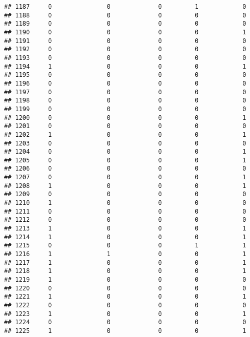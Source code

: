 \documentclass[]{article}
\begin{document}
\begin{verbatim}
## 1187     0               0             0         1            0
## 1188     0               0             0         0            0
## 1189     0               0             0         0            0
## 1190     0               0             0         0            1
## 1191     0               0             0         0            0
## 1192     0               0             0         0            0
## 1193     0               0             0         0            0
## 1194     1               0             0         0            1
## 1195     0               0             0         0            0
## 1196     0               0             0         0            0
## 1197     0               0             0         0            0
## 1198     0               0             0         0            0
## 1199     0               0             0         0            0
## 1200     0               0             0         0            1
## 1201     0               0             0         0            0
## 1202     1               0             0         0            1
## 1203     0               0             0         0            0
## 1204     0               0             0         0            1
## 1205     0               0             0         0            1
## 1206     0               0             0         0            0
## 1207     0               0             0         0            1
## 1208     1               0             0         0            1
## 1209     0               0             0         0            0
## 1210     1               0             0         0            0
## 1211     0               0             0         0            0
## 1212     0               0             0         0            0
## 1213     1               0             0         0            1
## 1214     1               0             0         0            1
## 1215     0               0             0         1            1
## 1216     1               1             0         0            1
## 1217     1               0             0         0            1
## 1218     1               0             0         0            1
## 1219     1               0             0         0            0
## 1220     0               0             0         0            0
## 1221     1               0             0         0            1
## 1222     0               0             0         0            0
## 1223     1               0             0         0            1
## 1224     0               0             0         0            0
## 1225     1               0             0         0            1

\end{verbatim}
\end{document}
